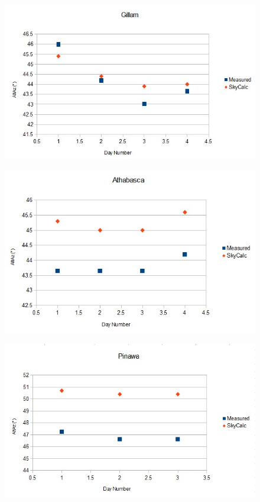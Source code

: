 \documentclass[11pt]{article}
\begin{document}
\begin{figure}[h!]
\includegraphics[scale=1.0]{gillam_AltAz_comparison.jpg}
\end{figure}

\begin{figure}[h!]
\includegraphics[scale=1.0]{athabasca_AltAz_comparison.jpg}
\end{figure}

\begin{figure}[h!]
\includegraphics[scale=1.0]{pinawa_AltAz_comparison.jpg}
\end{figure}
\end{document}
